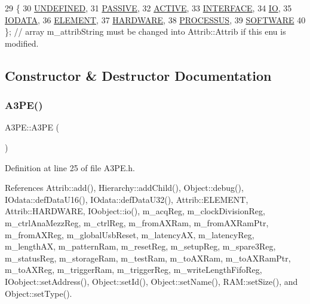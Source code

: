 \begin{DoxyCode}
29                 \{
30     \hyperlink{classAttrib_a69e171d7cc6417835a5a306d3c764235a3a8da2ab97dda18aebab196fe4100531}{UNDEFINED},
31     \hyperlink{classAttrib_a69e171d7cc6417835a5a306d3c764235a2bfb2af57b87031d190a05fe25dd92ed}{PASSIVE},
32     \hyperlink{classAttrib_a69e171d7cc6417835a5a306d3c764235a3b1fec929c0370d1436f2f06e298fb0d}{ACTIVE},
33     \hyperlink{classAttrib_a69e171d7cc6417835a5a306d3c764235aa27c16b480a369ea4d18b07b2516bbc7}{INTERFACE},
34     \hyperlink{classAttrib_a69e171d7cc6417835a5a306d3c764235a1420a5b8c0540b2af210b6975eded7f9}{IO},
35     \hyperlink{classAttrib_a69e171d7cc6417835a5a306d3c764235a0af3b0d0ac323c1704e6c69cf90add28}{IODATA},
36     \hyperlink{classAttrib_a69e171d7cc6417835a5a306d3c764235a7788bc5dd333fd8ce18562b269c9dab1}{ELEMENT},
37     \hyperlink{classAttrib_a69e171d7cc6417835a5a306d3c764235a61ceb22149f365f1780d18f9d1459423}{HARDWARE},
38     \hyperlink{classAttrib_a69e171d7cc6417835a5a306d3c764235a75250e29692496e73effca2c0330977f}{PROCESSUS},
39     \hyperlink{classAttrib_a69e171d7cc6417835a5a306d3c764235a103a67cd0b8f07ef478fa45d4356e27b}{SOFTWARE} 
40   \}; \textcolor{comment}{// array m\_attribString must be changed into Attrib::Attrib if this enu is modified. }
\end{DoxyCode}


\subsection{Constructor \& Destructor Documentation}
\mbox{\label{classA3PE_ae3e49a43c661f5e9c1b0edaee14fc297}} 
\subsubsection{\texorpdfstring{A3\+P\+E()}{A3PE()}}
{\footnotesize\ttfamily A3\+P\+E\+::\+A3\+PE (\begin{DoxyParamCaption}{ }\end{DoxyParamCaption})\hspace{0.3cm}{\ttfamily [inline]}}



Definition at line 25 of file A3\+P\+E.\+h.



References Attrib\+::add(), Hierarchy\+::add\+Child(), Object\+::debug(), I\+Odata\+::def\+Data\+U16(), I\+Odata\+::def\+Data\+U32(), Attrib\+::\+E\+L\+E\+M\+E\+NT, Attrib\+::\+H\+A\+R\+D\+W\+A\+RE, I\+Oobject\+::io(), m\+\_\+acq\+Reg, m\+\_\+clock\+Division\+Reg, m\+\_\+ctrl\+Ana\+Mezz\+Reg, m\+\_\+ctrl\+Reg, m\+\_\+from\+A\+X\+Ram, m\+\_\+from\+A\+X\+Ram\+Ptr, m\+\_\+from\+A\+X\+Reg, m\+\_\+global\+Usb\+Reset, m\+\_\+latency\+AX, m\+\_\+latency\+Reg, m\+\_\+length\+AX, m\+\_\+pattern\+Ram, m\+\_\+reset\+Reg, m\+\_\+setup\+Reg, m\+\_\+spare3\+Reg, m\+\_\+status\+Reg, m\+\_\+storage\+Ram, m\+\_\+test\+Ram, m\+\_\+to\+A\+X\+Ram, m\+\_\+to\+A\+X\+Ram\+Ptr, m\+\_\+to\+A\+X\+Reg, m\+\_\+trigger\+Ram, m\+\_\+trigger\+Reg, m\+\_\+write\+Length\+Fifo\+Reg, I\+Oobject\+::set\+Address(), Object\+::set\+Id(), Object\+::set\+Name(), R\+A\+M\+::set\+Size(), and Object\+::set\+Type().


